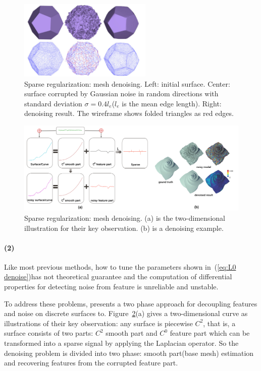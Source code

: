 \begin{figure}[ht]
  \centering
  \includegraphics[width=2.5in]{images/denoise1}
  \caption{Sparse regularization: mesh denoising\cite{he2013mesh}. Left: initial surface. Center: surface corrupted by Gaussian noise in random directions with standard deviation $\sigma=0.4l_{e}$($l_{e}$ is the mean edge length). Right: denoising result. The wireframe shows folded triangles as red edges.}
  \label{fig:L0 denoise}
\end{figure}

\begin{figure}[ht]
  \centering
  \includegraphics[width=5in]{images/denoise2_1}
  \caption{Sparse regularization: mesh denoising\cite{wang2014decoupling}. (a) is the two-dimensional illustration for their key observation. (b) is a denoising example.}
  \label{fig:decoupling}
\end{figure}

\paragraph{(2)}
Like most previous methods, how to tune the parameters shown in~(\ref{eq:L0 denoise})has not theoretical guarantee and the computation of differential properties for detecting noise from feature is unreliable and unstable.

To address these problems, \cite{wang2014decoupling} presents a two phase approach for decoupling features and noise on discrete surfaces to.
Figure~\ref{fig:decoupling}(a) gives a two-dimensional curve as illustrations of their key observation: any surface is piecewise $C^2$, that is, a surface consists of two parts: $C^2$ smooth part and $C^0$ feature part which can be transformed into a sparse signal by applying the Laplacian operator.
So the denoising problem is divided into two phase: smooth part(base mesh) estimation and recovering features from the corrupted feature part.

